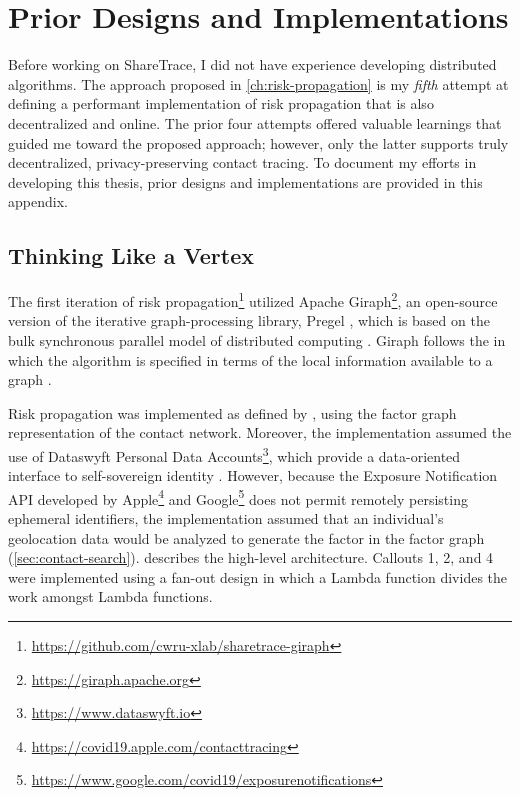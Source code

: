 \chapter{Prior Designs and Implementations}\label{ch:previous-designs}

Before working on ShareTrace, I did not have experience developing distributed algorithms. The approach proposed in \cref{ch:risk-propagation} is my \emph{fifth} attempt at defining a performant implementation of risk propagation that is also decentralized and online. The prior four attempts offered valuable learnings that guided me toward the proposed approach; however, only the latter supports truly decentralized, privacy-preserving contact tracing. To document my efforts in developing this thesis, prior designs and implementations are provided in this appendix.

\section{Thinking Like a Vertex}\label{sec:giraph}

The first iteration of risk propagation\footnote{\url{https://github.com/cwru-xlab/sharetrace-giraph}} utilized Apache Giraph\footnote{\url{https://giraph.apache.org}}, an open-source version of the iterative graph-processing library, Pregel \citep{Malewicz2010}, which is based on the bulk synchronous parallel model of distributed computing \citep{Valiant1990}. Giraph follows the  in which the algorithm is specified in terms of the local information available to a graph \vertexName \citep{McCune2015}.

Risk propagation was implemented as defined by \citet{Ayday2020,Ayday2021}, using the factor graph representation of the contact network. Moreover, the implementation assumed the use of Dataswyft Personal Data Accounts\footnote{\url{https://www.dataswyft.io}}, which provide a data-oriented interface to self-sovereign identity \citep[pp. 98--99]{Preukschat2021}. However, because the Exposure Notification API developed by Apple\footnote{\url{https://covid19.apple.com/contacttracing}} and Google\footnote{\url{https://www.google.com/covid19/exposurenotifications}} does not permit remotely persisting ephemeral identifiers, the implementation assumed that an individual's geolocation data would be analyzed to generate the factor \verticesName in the factor graph (\cref{sec:contact-search}).  describes the high-level architecture. Callouts 1, 2, and 4 were implemented using a fan-out design in which a  Lambda function divides the work amongst  Lambda functions.


